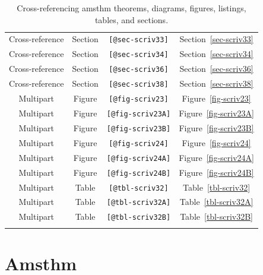 \documentclass[
  12pt,
  a4paper,
  oneside,
  numbers=noenddot,
  titlepage,
  toclink=all,
  toc=bibliography]{scrbook}
\theoremstyle{definition}
\theoremstyle{definition}
\theoremstyle{definition}
\theoremstyle{plain}
\theoremstyle{plain}
\theoremstyle{plain}
\theoremstyle{plain}
\theoremstyle{plain}
\theoremstyle{remark}
\begin{document}
\begin{longtable}[]{@{}cccc@{}}
Cross-reference & Section & \texttt{{[}@sec-scriv33{]}} &
\protect\hypertarget{cite_36}{}{\label{cite_36}Section~\ref{sec-scriv33}} \\
Cross-reference & Section & \texttt{{[}@sec-scriv34{]}} &
\protect\hypertarget{cite_37}{}{\label{cite_37}Section~\ref{sec-scriv34}} \\
Cross-reference & Section & \texttt{{[}@sec-scriv36{]}} &
\protect\hypertarget{cite_38}{}{\label{cite_38}Section~\ref{sec-scriv36}} \\
Cross-reference & Section & \texttt{{[}@sec-scriv38{]}} &
\protect\hypertarget{cite_39}{}{\label{cite_39}Section~\ref{sec-scriv38}} \\
Multipart & Figure & \texttt{{[}@fig-scriv23{]}} &
\protect\hypertarget{cite_40}{}{\label{cite_40}Figure~\ref{fig-scriv23}} \\
Multipart & Figure & \texttt{{[}@fig-scriv23A{]}} &
\protect\hypertarget{cite_41}{}{\label{cite_41}Figure~\ref{fig-scriv23A}} \\
Multipart & Figure & \texttt{{[}@fig-scriv23B{]}} &
\protect\hypertarget{cite_42}{}{\label{cite_42}Figure~\ref{fig-scriv23B}} \\
Multipart & Figure & \texttt{{[}@fig-scriv24{]}} &
\protect\hypertarget{cite_43}{}{\label{cite_43}Figure~\ref{fig-scriv24}} \\
Multipart & Figure & \texttt{{[}@fig-scriv24A{]}} &
\protect\hypertarget{cite_44}{}{\label{cite_44}Figure~\ref{fig-scriv24A}} \\
Multipart & Figure & \texttt{{[}@fig-scriv24B{]}} &
\protect\hypertarget{cite_45}{}{\label{cite_45}Figure~\ref{fig-scriv24B}} \\
Multipart & Table & \texttt{{[}@tbl-scriv32{]}} &
\protect\hypertarget{cite_46}{}{\label{cite_46}Table~\ref{tbl-scriv32}} \\
Multipart & Table & \texttt{{[}@tbl-scriv32A{]}} &
\protect\hypertarget{cite_47}{}{\label{cite_47}Table~\ref{tbl-scriv32A}} \\
Multipart & Table & \texttt{{[}@tbl-scriv32B{]}} &
\protect\hypertarget{cite_48}{}{\label{cite_48}Table~\ref{tbl-scriv32B}} \\
\caption{\label{tbl-scriv3}Cross-referencing amsthm theorems, diagrams,
figures, listings, tables, and sections.}\tabularnewline
\end{longtable}

\newpage{}

\hypertarget{sec-scriv4}{%
\section{Amsthm}\label{sec-scriv4}}
\end{document}
